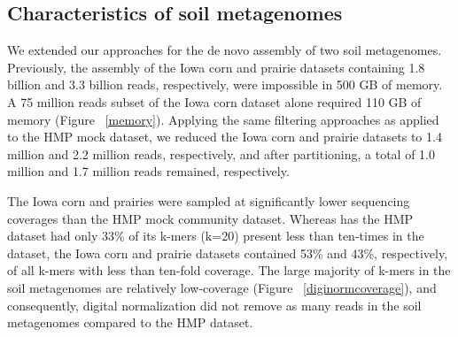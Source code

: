 \documentclass[11pt]{article} %
\begin{document}
\subsection{Characteristics of soil metagenomes}

We extended our approaches for the de novo assembly of two soil metagenomes.  Previously, the assembly of the Iowa corn and prairie datasets containing 1.8 billion and 3.3 billion reads, respectively, were impossible in 500 GB of memory.   A 75 million reads subset of the Iowa corn dataset alone required 110 GB of memory (Figure ~\ref{memory}).  Applying the same filtering approaches as applied to the HMP mock dataset, we reduced the Iowa corn and prairie datasets to 1.4 million and 2.2 million reads, respectively, and after partitioning, a total of 1.0 million and 1.7 million reads remained, respectively.  

The Iowa corn and prairies were sampled at significantly lower sequencing coverages than the HMP mock community dataset.  Whereas has the HMP dataset had only 33\% of its k-mers (k=20) present less than ten-times in the dataset, the Iowa corn and prairie datasets contained 53\% and 43\%, respectively, of all k-mers with less than ten-fold coverage.  The large majority of k-mers in the soil metagenomes are relatively low-coverage (Figure ~\ref{diginormcoverage}), and consequently, digital normalization did not remove as many reads in the soil metagenomes compared to the HMP dataset.
\end{document}
